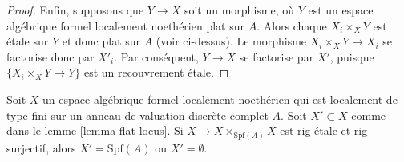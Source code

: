 \begin{proof}
\medskip\noindent
Enfin, supposons que $Y \to X$ soit un morphisme, où
$Y$ est un espace algébrique formel localement noethérien plat sur $A$.
Alors chaque $X_i \times_X Y$ est étale sur $Y$ et
donc plat sur $A$ (voir ci-dessus).
Le morphisme $X_i \times_X Y \to X_i$ se factorise donc par $X'_i$.
Par conséquent, $Y \to X$ se factorise par $X'$, puisque
$\{X_i \times_X Y \to Y\}$ est un recouvrement étale.
\end{proof}

\begin{lemma}
\label{lemma-flat-and-diagonal-rig-surjective}
Soit $X$ un espace algébrique formel localement noethérien qui est
localement de type fini sur un anneau de valuation discrète complet $A$.
Soit $X' \subset X$ comme dans le lemme \ref{lemma-flat-locus}.
Si $X \to X \times_{\text{Spf}(A)} X$ est rig-étale et rig-surjectif,
alors $X' = \text{Spf}(A)$ ou $X' = \emptyset$.
\end{lemma}

